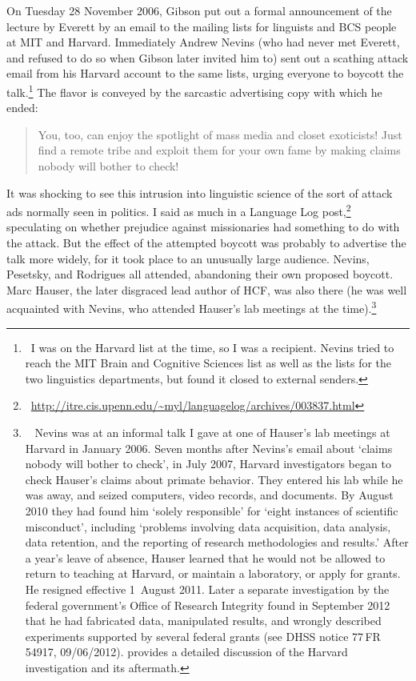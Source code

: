 \documentclass[output=paper,colorlinks,citecolor=brown
]{langscibook}
\begin{document}
On Tuesday 28 November 2006, Gibson put out a formal announcement of
the lecture by Everett by an email to the mailing lists for linguists
and BCS people at MIT and Harvard. Immediately Andrew Nevins (who had
never met Everett, and refused to do so when Gibson later invited him to)
sent out a scathing attack email from his Harvard account to the same
lists, urging everyone to boycott the talk.\footnote{\,
   I was on the Harvard list at the time, so I was a recipient. Nevins
   tried to reach the MIT Brain and Cognitive Sciences list as well as
   the lists for the two linguistics departments, but found it closed to
   external senders.}
The flavor is conveyed by the sarcastic advertising copy with which
he ended:
\begin{quote}
\textsf{You, too, can enjoy the spotlight of mass media and closet
exoticists! Just find a remote tribe and exploit them for your
own fame by making claims nobody will bother to check!}
\end{quote}

It was shocking to see this intrusion into linguistic science of the
sort of attack ads normally seen in politics. I said as much in a
Language Log post,\footnote{\,
   \url{http://itre.cis.upenn.edu/~myl/languagelog/archives/003837.html}}
speculating on whether prejudice against missionaries had something to
do with the attack. But the effect of the attempted boycott was probably
to advertise the talk more widely, for it took place to an unusually
large audience. Nevins, Pesetsky, and Rodrigues all attended, abandoning
their own proposed boycott.  Marc Hauser, the later disgraced lead author
of HCF, was also there (he was well acquainted with Nevins, who attended
Hauser's lab meetings at the time).\footnote{\label{misconduct}~
   Nevins was at an informal talk I gave at one of Hauser's lab meetings
   at Harvard in January 2006. Seven months after Nevins's email about
   `claims nobody will bother to check', in July 2007, Harvard
   investigators began to check Hauser's claims about primate behavior.
   They entered his lab while he was away, and seized computers, video
   records, and documents. By August 2010 they had found him `solely
   responsible' for `eight instances of scientific misconduct', including
   `problems involving data acquisition, data analysis, data retention,
   and the reporting of research methodologies and results.' After a year's
   leave of absence, Hauser learned that he would not be allowed to return
   to teaching at Harvard, or maintain a laboratory, or apply for grants.
   He resigned effective 1~August 2011. Later a separate investigation by
   the federal government's Office of Research Integrity found in September
   2012 that he had fabricated data, manipulated results, and wrongly
   described experiments supported by several federal grants (see DHSS
   notice 77\,FR\,54917, 09/06/2012). \citet{Gross11} provides a detailed
   discussion of the Harvard investigation and its aftermath.}
\end{document}
